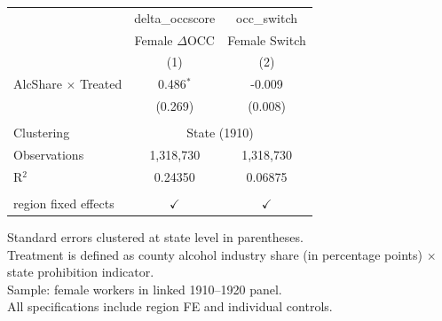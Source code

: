 
\begingroup
\centering
\begin{tabular}{lcc}
   \toprule
                              & delta\_occscore     & occ\_switch\\
                              & Female $\Delta$OCC  & Female Switch \\
                              & (1)                 & (2)\\
   \midrule
   AlcShare $\times$ Treated  & 0.486$^{*}$         & -0.009\\
                              & (0.269)             & (0.008)\\
    \\
   Clustering & \multicolumn{2}{c}{State (1910)} \\
   Observations               & 1,318,730           & 1,318,730\\
   R$^2$                      & 0.24350             & 0.06875\\
    \\
   region fixed effects       & $\checkmark$        & $\checkmark$\\
   \bottomrule
\end{tabular}

\par \raggedright
Standard errors clustered at state level in parentheses.\\
Treatment is defined as county alcohol industry share (in percentage points) $\times$ state prohibition indicator.\\
Sample: female workers in linked 1910--1920 panel.\\
All specifications include region FE and individual controls.
\par\endgroup

